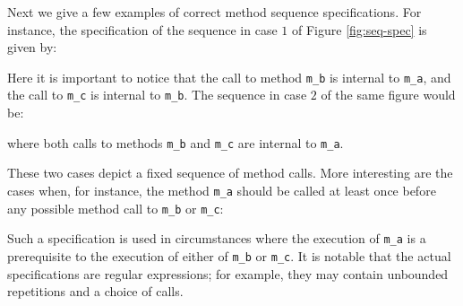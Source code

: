 Next we give a few examples of correct method sequence specifications. 
For instance, the specification of the sequence in case $1$ of
Figure \ref{fig:seq-spec} is given by:

Here it is important to notice that the call to method  \texttt{m\_b} is internal
to \texttt{m\_a}, and the call to \texttt{m\_c} is internal to \texttt{m\_b}.
The sequence in case $2$ of the same figure would be:

where both calls to methods  \texttt{m\_b} and \texttt{m\_c} are internal to
\texttt{m\_a}.

These two cases depict a fixed sequence of method calls. More interesting are the cases when,
for instance, the method \texttt{m\_a} should be called at least once before any possible
method call to \texttt{m\_b} or \texttt{m\_c}:


Such a specification is used in circumstances where the execution of  \texttt{m\_a} is a prerequisite to the execution of either of \texttt{m\_b} or \texttt{m\_c}.
% 
It is notable that the actual specifications are regular expressions;
for example, they may contain  unbounded repetitions and a choice of calls.


